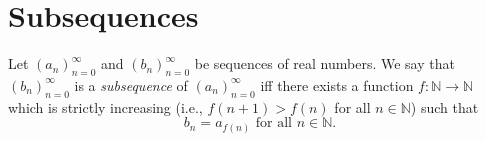 \section{Subsequences}\label{sec 6.6}

\begin{definition}[Subsequences]\label{6.6.1}
Let \((a_n)_{n = 0}^\infty\) and \((b_n)_{n = 0}^\infty\) be sequences of real numbers.
We say that \((b_n)_{n = 0}^\infty\) is a \emph{subsequence} of \((a_n)_{n = 0}^\infty\) iff there exists a function \(f : \mathds{N} \to \mathds{N}\) which is strictly increasing (i.e., \(f(n + 1) > f(n)\) for all \(n \in \mathds{N}\)) such that
\[
    b_n = a_{f(n)} \text{ for all } n \in \mathds{N}.
\]
\end{definition}